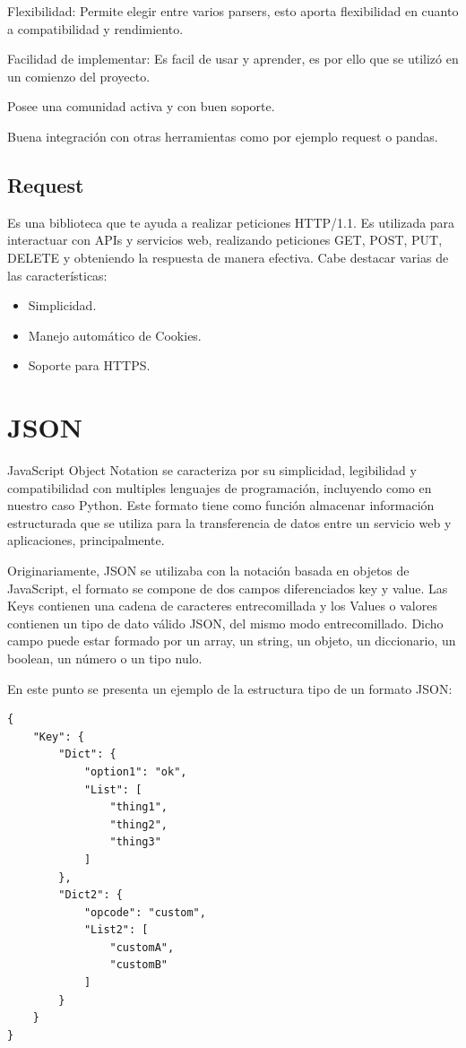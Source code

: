 \documentclass[a4paper, 12pt]{book}
\begin{document}
Flexibilidad: Permite elegir entre varios parsers, esto aporta flexibilidad en cuanto a compatibilidad y rendimiento.

Facilidad de implementar: Es facil de usar y aprender, es por ello que se utilizó en un comienzo del proyecto.

Posee una comunidad activa y con buen soporte.

Buena integración con otras herramientas como por ejemplo request o pandas.

\subsection{Request}
Es una biblioteca que te ayuda a realizar peticiones HTTP/1.1. Es utilizada para interactuar con APIs y servicios web, realizando peticiones GET, POST, PUT, DELETE y obteniendo la respuesta de manera efectiva. Cabe destacar varias de las características:

\begin{itemize}
    \item Simplicidad.
    \item Manejo automático de Cookies.
    \item Soporte para HTTPS.
\end{itemize}


\section{JSON} 
\label{sec:seccion1}

JavaScript Object Notation se caracteriza por su simplicidad, legibilidad y compatibilidad con multiples lenguajes de programación, incluyendo como en nuestro caso Python.
Este formato tiene como función almacenar información estructurada que se utiliza para la transferencia de datos entre un servicio web y aplicaciones, principalmente.

Originariamente, JSON se utilizaba con la notación basada en objetos de JavaScript, el formato se compone de dos campos diferenciados key y value.
Las Keys contienen una cadena de caracteres entrecomillada y los Values o valores contienen un tipo de dato válido JSON, del mismo modo entrecomillado. Dicho campo puede estar formado por un array, un string, un objeto, un diccionario, un boolean, un número o un tipo nulo.

En este punto se presenta un ejemplo de la estructura tipo de un formato JSON:

\begin{lstlisting}
{
    "Key": {
        "Dict": {
            "option1": "ok",
            "List": [
                "thing1",
                "thing2",
                "thing3"
            ]
        },
        "Dict2": {
            "opcode": "custom",
            "List2": [
                "customA",
                "customB"
            ]
        }
    }
}
\end{lstlisting}
\end{document}
